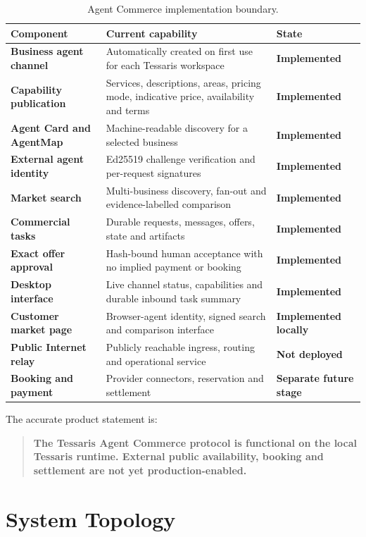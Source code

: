 \documentclass[11pt,a4paper]{article}
\newcommand{\status}[1]{\textbf{\textcolor{TessarisMint}{#1}}}
\begin{document}
\begin{table}[ht]
\centering
\begin{tabularx}{\textwidth}{>{\bfseries}p{42mm}Y>{\raggedright\arraybackslash}p{32mm}}
\toprule
Component & Current capability & State \\
\midrule
Business agent channel & Automatically created on first use for each Tessaris workspace & \status{Implemented} \\
Capability publication & Services, descriptions, areas, pricing mode, indicative price, availability and terms & \status{Implemented} \\
Agent Card and AgentMap & Machine-readable discovery for a selected business & \status{Implemented} \\
External agent identity & Ed25519 challenge verification and per-request signatures & \status{Implemented} \\
Market search & Multi-business discovery, fan-out and evidence-labelled comparison & \status{Implemented} \\
Commercial tasks & Durable requests, messages, offers, state and artifacts & \status{Implemented} \\
Exact offer approval & Hash-bound human acceptance with no implied payment or booking & \status{Implemented} \\
Desktop interface & Live channel status, capabilities and durable inbound task summary & \status{Implemented} \\
Customer market page & Browser-agent identity, signed search and comparison interface & \status{Implemented locally} \\
Public Internet relay & Publicly reachable ingress, routing and operational service & \textbf{Not deployed} \\
Booking and payment & Provider connectors, reservation and settlement & \textbf{Separate future stage} \\
\bottomrule
\end{tabularx}
\caption{Agent Commerce implementation boundary.}
\end{table}

The accurate product statement is:

\begin{quote}
\textbf{The Tessaris Agent Commerce protocol is functional on the local
Tessaris runtime.  External public availability, booking and settlement are not
yet production-enabled.}
\end{quote}

\section{System Topology}
\end{document}
